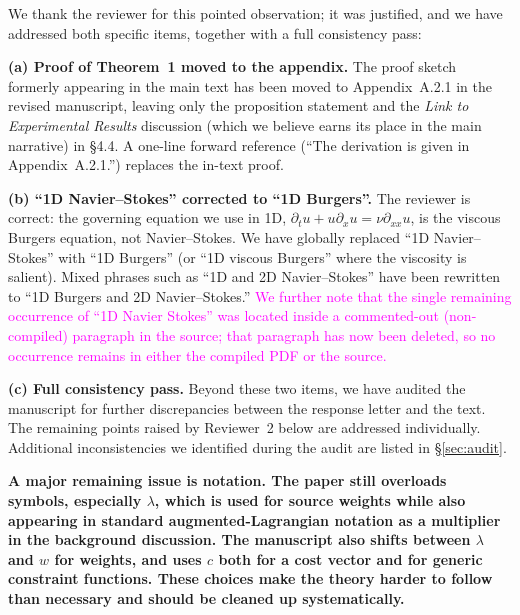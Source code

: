 \documentclass{article}
\newenvironment{QandA}{\begin{enumerate}[label=\bfseries\alph*.]\bfseries}
                      {\end{enumerate}}
\newenvironment{answered}{\par\normalfont}{}
\newcommand{\audit}[1]{\textcolor{magenta}{#1}}  %
\begin{document}
\begin{answered}
We thank the reviewer for this pointed observation; it was justified, and we
have addressed both specific items, together with a full consistency pass:

\textbf{(a) Proof of Theorem~1 moved to the appendix.} The proof sketch
formerly appearing in the main text has been moved to
Appendix~A.2.1 in the revised manuscript, leaving only the proposition statement and the \emph{Link to Experimental Results} discussion (which we believe earns its place in the main narrative) in \S4.4. A one-line forward reference (``The derivation is given in Appendix~A.2.1.'') replaces the in-text proof.

\textbf{(b) ``1D Navier--Stokes'' corrected to ``1D Burgers''.} The reviewer
is correct: the governing equation we use in 1D,
$\partial_t u + u\partial_x u = \nu\partial_{xx} u$, is the viscous Burgers
equation, not Navier--Stokes. We have globally
replaced ``1D Navier--Stokes'' with ``1D Burgers'' (or ``1D viscous Burgers''
where the viscosity is salient). Mixed phrases such as ``1D and 2D
Navier--Stokes'' have been rewritten to ``1D Burgers and 2D Navier--Stokes.''
\audit{We further note that the single remaining occurrence of ``1D Navier
Stokes'' was located inside a commented-out (non-compiled) paragraph in the
source; that paragraph has now been deleted, so no occurrence remains in
either the compiled PDF or the source.}

\textbf{(c) Full consistency pass.} Beyond these two items, we have audited
the manuscript for further discrepancies between the response letter and the
text. The remaining points raised by Reviewer~2 below are addressed
individually. Additional inconsistencies we identified during the audit
are listed in \S\ref{sec:audit}.
\end{answered}

\begin{QandA}
A major remaining issue is notation. The paper still overloads symbols,
especially $\lambda$, which is used for source weights while also appearing
in standard augmented-Lagrangian notation as a multiplier in the background
discussion. The manuscript also shifts between $\lambda$ and $w$ for weights,
and uses $c$ both for a cost vector and for generic constraint functions.
These choices make the theory harder to follow than necessary and should be
cleaned up systematically.
\end{QandA}
\end{document}
